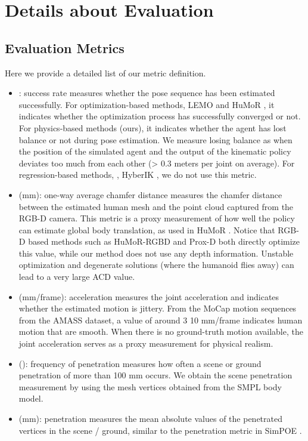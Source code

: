 \section{Details about Evaluation}
\subsection{Evaluation Metrics}
Here we provide a detailed list of our metric definition.
\begin{itemize}
    \item : success rate measures whether the pose sequence has been estimated successfully. For optimization-based methods, LEMO \cite{lemo:2021} and HuMoR \cite{rempe2021humor}, it indicates whether the optimization process has successfully converged or not. For physics-based methods (ours), it indicates whether the agent has lost balance or not during pose estimation. We measure losing balance as when the position of the simulated agent  and the output of the kinematic policy  deviates too much from each other (> 0.3 meters per joint on average). For regression-based methods, \eg, HyberIK \cite{li2021hybrik}, we do not use this metric. 
    \item  (mm): one-way  average chamfer distance measures the chamfer distance between the estimated human mesh and the point cloud captured from the RGB-D camera. This metric is a proxy measurement of how well the policy can estimate global body translation, as used in HuMoR \cite{rempe2021humor}. Notice that RGB-D based methods such as HuMoR-RGBD and Prox-D both directly optimize this value, while our method does not use any depth information. Unstable optimization and degenerate solutions (where the humanoid flies away) can lead to a very large ACD value. 
    \item  (mm/frame): acceleration measures the joint acceleration and indicates whether the estimated motion is jittery. From the MoCap motion sequences from the AMASS dataset, a value of around 3  10 mm/frame indicates human motion that are smooth. When there is no ground-truth motion available, the joint acceleration serves as a proxy measurement for physical realism. 
    \item  (): frequency of penetration measures how often a scene or ground penetration of more than 100 mm occurs. We obtain the scene penetration measurement by using the mesh vertices obtained from the SMPL body model. 
    \item  (mm): penetration measures the mean absolute values of the penetrated vertices in the scene / ground, similar to the penetration metric in SimPOE \cite{yuan2021simpoe}. 

\end{itemize}
